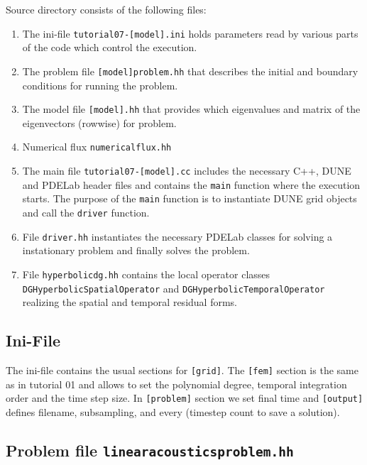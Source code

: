\documentclass[a4paper,12pt]{article}
\theoremstyle{definition}
\theoremstyle{definition}
\begin{document}
Source directory consists of the following files:
\begin{enumerate}[1)]
	\item The ini-file
	\lstinline{tutorial07-[model].ini} holds parameters read by various parts of the code
	which control the execution.
	\item The problem file \lstinline{[model]problem.hh} that describes the initial and boundary conditions for running the problem.
	\item The model file \lstinline{[model].hh} that provides  which eigenvalues and matrix  of the eigenvectors (rowwise) for problem.
	\item Numerical flux \lstinline{numericalflux.hh}
	\item The main file \lstinline{tutorial07-[model].cc} includes the necessary C++,
	DUNE and PDELab header files
	and contains the \lstinline{main} function where the execution starts.
	The purpose of the \lstinline{main} function is
	to instantiate DUNE grid objects and call the \lstinline{driver} function.
	\item File \lstinline{driver.hh} instantiates the necessary PDELab classes
	for solving a instationary problem and finally solves the problem.
	\item File \lstinline{hyperbolicdg.hh} contains the local operator classes \\
	\lstinline{DGHyperbolicSpatialOperator} and 
	\lstinline{DGHyperbolicTemporalOperator} realizing the spatial
	and temporal residual forms.
	
\end{enumerate}


\subsection{Ini-File}

The ini-file contains the usual sections for \lstinline{[grid]}. The
\lstinline{[fem]} section is the same as in tutorial 01 and allows to set
the polynomial degree, temporal integration order and the time step size. In \lstinline{[problem]} section we set final time and \lstinline{[output]} defines filename,
subsampling, and every (timestep count to save a solution).     



\subsection{Problem file \lstinline{linearacousticsproblem.hh}}
\end{document}
